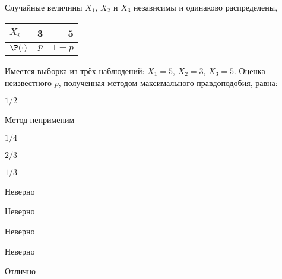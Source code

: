 
\begin{question}
Случайные величины \(X_1\), \(X_2\) и \(X_3\) независимы и одинаково
распределены,

\begin{center}
  \begin{tabular}{lrr} \toprule
  $X_i$ & 3 & 5 \\
  \midrule
  $\P(\cdot)$ & $p$ & $1-p$ \\
  \bottomrule
  \end{tabular}
\end{center}

Имеется выборка из трёх наблюдений: \(X_1=5\), \(X_2=3\), \(X_3=5\).
Оценка неизвестного \(p\), полученная методом максимального
правдоподобия, равна:
\begin{answerlist}
  \item \(1/2\)
  \item Метод неприменим
  \item \(1/4\)
  \item \(2/3\)
  \item \(1/3\)
\end{answerlist}
\end{question}

\begin{solution}
\begin{answerlist}
  \item Неверно
  \item Неверно
  \item Неверно
  \item Неверно
  \item Отлично
\end{answerlist}
\end{solution}

